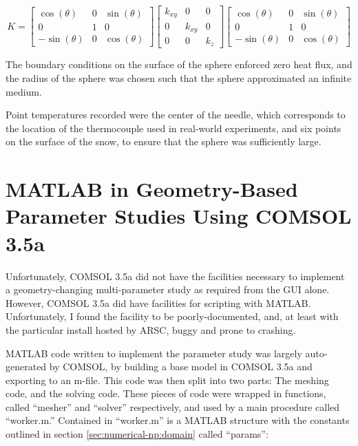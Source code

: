 \begin{equation}
\label{eq:rotdiagrot}
K = \begin{bmatrix}
\cos(\theta) & 0 & \sin(\theta)\\
0 & 1 & 0\\
-\sin(\theta) & 0 &\cos(\theta)
\end{bmatrix}
\begin{bmatrix}
k_{xy} & 0 & 0\\
0 & k_{xy} & 0\\
0 & 0 & k_z
\end{bmatrix}
\begin{bmatrix}
\cos(\theta) & 0 & \sin(\theta)\\
0 & 1 & 0\\
-\sin(\theta) & 0 &\cos(\theta)
\end{bmatrix}
\end{equation}

The boundary conditions on the surface of the sphere enforced zero heat flux,
and the radius of the sphere was chosen such that the sphere approximated an
infinite medium.

Point temperatures recorded were the center of the needle, which corresponds to
the location of the thermocouple used in real-world experiments, and six points
on the surface of the snow, to ensure that the sphere was sufficiently large.

\section{MATLAB in Geometry-Based Parameter Studies Using COMSOL 3.5a}
\label{sec:numerical-np:matlab}

Unfortunately, COMSOL 3.5a did not have the facilities necessary to implement a
geometry-changing multi-parameter study as required from the GUI alone. However,
COMSOL 3.5a did have facilities for scripting with MATLAB. Unfortunately, I
found the facility to be poorly-documented, and, at least with the particular
install hosted by ARSC, buggy and prone to crashing.

MATLAB code written to implement the parameter study was largely auto-generated
by COMSOL, by building a base model in COMSOL 3.5a and exporting to an m-file.
This code was then split into two parts: The meshing code, and the solving code.
These pieces of code were wrapped in functions, called ``mesher'' and ``solver''
respectively, and used by a main procedure called ``worker.m.'' Contained in
``worker.m'' is a MATLAB structure with the constants outlined in section
\ref{sec:numerical-np:domain} called ``params'':

